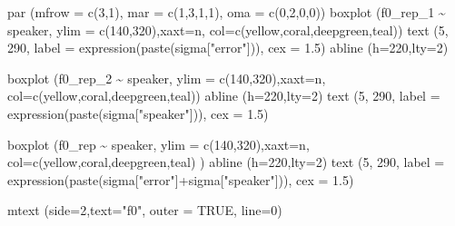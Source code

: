 \documentclass[
]{book}
\newenvironment{Shaded}{\begin{snugshade}}{\end{snugshade}}
\newcommand{\AttributeTok}[1]{\textcolor[rgb]{0.77,0.63,0.00}{#1}}
\newcommand{\ConstantTok}[1]{\textcolor[rgb]{0.00,0.00,0.00}{#1}}
\newcommand{\DecValTok}[1]{\textcolor[rgb]{0.00,0.00,0.81}{#1}}
\newcommand{\FloatTok}[1]{\textcolor[rgb]{0.00,0.00,0.81}{#1}}
\newcommand{\FunctionTok}[1]{\textcolor[rgb]{0.00,0.00,0.00}{#1}}
\newcommand{\NormalTok}[1]{#1}
\newcommand{\SpecialCharTok}[1]{\textcolor[rgb]{0.00,0.00,0.00}{#1}}
\newcommand{\StringTok}[1]{\textcolor[rgb]{0.31,0.60,0.02}{#1}}
\begin{document}
\begin{Shaded}
\begin{Highlighting}[]
\FunctionTok{par}\NormalTok{ (}\AttributeTok{mfrow =} \FunctionTok{c}\NormalTok{(}\DecValTok{3}\NormalTok{,}\DecValTok{1}\NormalTok{), }\AttributeTok{mar =} \FunctionTok{c}\NormalTok{(}\DecValTok{1}\NormalTok{,}\DecValTok{3}\NormalTok{,}\DecValTok{1}\NormalTok{,}\DecValTok{1}\NormalTok{), }\AttributeTok{oma =} \FunctionTok{c}\NormalTok{(}\DecValTok{0}\NormalTok{,}\DecValTok{2}\NormalTok{,}\DecValTok{0}\NormalTok{,}\DecValTok{0}\NormalTok{))}
\FunctionTok{boxplot}\NormalTok{ (f0\_rep\_1 }\SpecialCharTok{\textasciitilde{}}\NormalTok{ speaker, }\AttributeTok{ylim =} \FunctionTok{c}\NormalTok{(}\DecValTok{140}\NormalTok{,}\DecValTok{320}\NormalTok{),}\AttributeTok{xaxt=}\StringTok{\textquotesingle{}n\textquotesingle{}}\NormalTok{,}
         \AttributeTok{col=}\FunctionTok{c}\NormalTok{(yellow,coral,deepgreen,teal))}
\FunctionTok{text}\NormalTok{ (}\DecValTok{5}\NormalTok{, }\DecValTok{290}\NormalTok{, }\AttributeTok{label =} \FunctionTok{expression}\NormalTok{(}\FunctionTok{paste}\NormalTok{(sigma[}\StringTok{"error"}\NormalTok{])), }\AttributeTok{cex =} \FloatTok{1.5}\NormalTok{)}
\FunctionTok{abline}\NormalTok{ (}\AttributeTok{h=}\DecValTok{220}\NormalTok{,}\AttributeTok{lty=}\DecValTok{2}\NormalTok{)}

\FunctionTok{boxplot}\NormalTok{ (f0\_rep\_2 }\SpecialCharTok{\textasciitilde{}}\NormalTok{ speaker, }\AttributeTok{ylim =} \FunctionTok{c}\NormalTok{(}\DecValTok{140}\NormalTok{,}\DecValTok{320}\NormalTok{),}\AttributeTok{xaxt=}\StringTok{\textquotesingle{}n\textquotesingle{}}\NormalTok{,}
         \AttributeTok{col=}\FunctionTok{c}\NormalTok{(yellow,coral,deepgreen,teal))}
\FunctionTok{abline}\NormalTok{ (}\AttributeTok{h=}\DecValTok{220}\NormalTok{,}\AttributeTok{lty=}\DecValTok{2}\NormalTok{)}
\FunctionTok{text}\NormalTok{ (}\DecValTok{5}\NormalTok{, }\DecValTok{290}\NormalTok{, }\AttributeTok{label =} \FunctionTok{expression}\NormalTok{(}\FunctionTok{paste}\NormalTok{(sigma[}\StringTok{"speaker"}\NormalTok{])), }\AttributeTok{cex =} \FloatTok{1.5}\NormalTok{)}

\FunctionTok{boxplot}\NormalTok{ (f0\_rep }\SpecialCharTok{\textasciitilde{}}\NormalTok{ speaker, }\AttributeTok{ylim =} \FunctionTok{c}\NormalTok{(}\DecValTok{140}\NormalTok{,}\DecValTok{320}\NormalTok{),}\AttributeTok{xaxt=}\StringTok{\textquotesingle{}n\textquotesingle{}}\NormalTok{,}
         \AttributeTok{col=}\FunctionTok{c}\NormalTok{(yellow,coral,deepgreen,teal)  )}
\FunctionTok{abline}\NormalTok{ (}\AttributeTok{h=}\DecValTok{220}\NormalTok{,}\AttributeTok{lty=}\DecValTok{2}\NormalTok{)}
\FunctionTok{text}\NormalTok{ (}\DecValTok{5}\NormalTok{, }\DecValTok{290}\NormalTok{, }\AttributeTok{label =} \FunctionTok{expression}\NormalTok{(}\FunctionTok{paste}\NormalTok{(sigma[}\StringTok{"error"}\NormalTok{]}\SpecialCharTok{+}\NormalTok{sigma[}\StringTok{"speaker"}\NormalTok{])), }\AttributeTok{cex =} \FloatTok{1.5}\NormalTok{)}

\FunctionTok{mtext}\NormalTok{ (}\AttributeTok{side=}\DecValTok{2}\NormalTok{,}\AttributeTok{text=}\StringTok{"f0"}\NormalTok{, }\AttributeTok{outer =} \ConstantTok{TRUE}\NormalTok{, }\AttributeTok{line=}\DecValTok{0}\NormalTok{)}
\end{Highlighting}
\end{Shaded}
\end{document}
